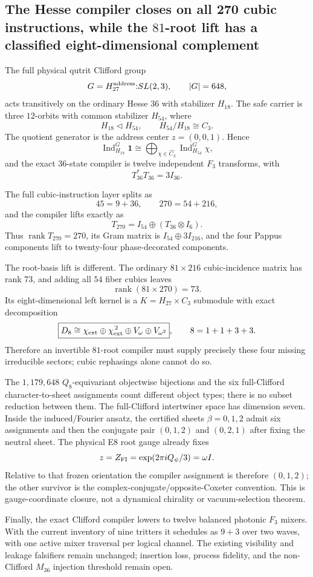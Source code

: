 \subsection*{The Hesse compiler closes on all 270 cubic instructions, while the $81$-root lift has a classified eight-dimensional complement}

The full physical qutrit Clifford group
\[
G=H_{27}^{\rm address}{:}SL(2,3),\qquad |G|=648,
\]
acts transitively on the ordinary Hesse $36$ with stabilizer $H_{18}$.
The safe carrier is three $12$-orbits with common stabilizer $H_{54}$,
where
\[
H_{18}\triangleleft H_{54},
\qquad H_{54}/H_{18}\cong C_3.
\]
The quotient generator is the address center $z=(0,0,1)$.  Hence
\[
\operatorname{Ind}_{H_{18}}^G\mathbf1
\cong
\bigoplus_{\chi\in\widehat{C_3}}
\operatorname{Ind}_{H_{54}}^G\chi ,
\]
and the exact $36$-state compiler is twelve independent $F_3$ transforms,
with
\[
T_{36}^{*}T_{36}=3I_{36}.
\]

The full cubic-instruction layer splits as
\[
45=9+36,
\qquad
270=54+216,
\]
and the compiler lifts exactly as
\[
\boxed{
T_{270}
=
I_{54}\oplus(T_{36}\otimes I_6)
}.
\]
Thus $\operatorname{rank}T_{270}=270$, its Gram matrix is
$I_{54}\oplus3I_{216}$, and the four Pappus components lift to twenty-four
phase-decorated components.

The root-basis lift is different.  The ordinary $81\times216$ cubic-incidence
matrix has rank $73$, and adding all $54$ fiber cubics leaves
\[
\boxed{\operatorname{rank}(81\times270)=73}.
\]
Its eight-dimensional left kernel is a $K=H_{27}\times C_3$ submodule with
exact decomposition
\[
\boxed{
D_8
\cong
\chi_{\rm ext}\oplus\chi_{\rm ext}^{\,2}
\oplus V_{\omega}\oplus V_{\omega^2}
},
\qquad
8=1+1+3+3.
\]
Therefore an invertible $81$-root compiler must supply precisely these four
missing irreducible sectors; cubic rephasings alone cannot do so.

The $1{,}179{,}648$ $Q_8$-equivariant objectwise bijections and the six
full-Clifford character-to-sheet assignments count different object types;
there is no subset reduction between them.  The full-Clifford intertwiner
space has dimension seven.  Inside the induced/Fourier ansatz, the certified
sheets $\beta=0,1,2$ admit six assignments and then the conjugate pair
$(0,1,2)$ and $(0,2,1)$ after fixing the neutral sheet.  The physical E8
root gauge already fixes
\[
z=Z_{\rm FI}=\exp(2\pi iQ_\psi/3)=\omega I .
\]
Relative to that frozen orientation the compiler assignment is therefore
$(0,1,2)$; the other survivor is the complex-conjugate/opposite-Coxeter
convention.  This is gauge-coordinate closure, not a dynamical chirality or
vacuum-selection theorem.

Finally, the exact Clifford compiler lowers to twelve balanced photonic
$F_3$ mixers.  With the current inventory of nine tritters it schedules as
$9+3$ over two waves, with one active mixer traversal per logical channel.
The existing visibility and leakage falsifiers remain unchanged; insertion
loss, process fidelity, and the non-Clifford $M_{36}$ injection threshold
remain open.
